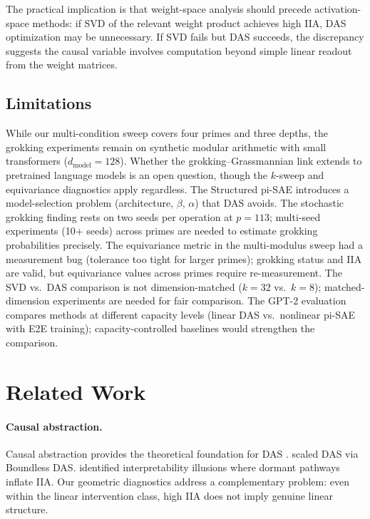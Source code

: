 \documentclass{article}
\begin{document}
The practical implication is that weight-space analysis should precede
activation-space methods: if SVD of the relevant weight product achieves
high IIA, DAS optimization may be unnecessary. If SVD fails but DAS
succeeds, the discrepancy suggests the causal variable involves
computation beyond simple linear readout from the weight matrices.

\subsection{Limitations}

While our multi-condition sweep covers four primes and three depths, the
grokking experiments remain on synthetic modular arithmetic with small
transformers ($d_\text{model} = 128$). Whether the grokking--Grassmannian
link extends to pretrained language models is an open question, though the
$k$-sweep and equivariance diagnostics apply regardless. The Structured
pi-SAE introduces a model-selection problem (architecture, $\beta$, $\alpha$)
that DAS avoids. The stochastic grokking finding rests on two seeds per
operation at $p{=}113$; multi-seed experiments (10+ seeds) across primes are
needed to estimate grokking probabilities precisely. The equivariance metric
in the multi-modulus sweep had a measurement bug (tolerance too tight for
larger primes); grokking status and IIA are valid, but equivariance values
across primes require re-measurement. The SVD vs.\ DAS comparison is not
dimension-matched ($k = 32$ vs.\ $k = 8$); matched-dimension experiments
are needed for fair comparison. The GPT-2 evaluation compares methods at
different capacity levels (linear DAS vs.\ nonlinear pi-SAE with E2E
training); capacity-controlled baselines would strengthen the comparison.


\section{Related Work}
\label{sec:related}

\paragraph{Causal abstraction.}
Causal abstraction provides the theoretical foundation for DAS
\citep{geiger2021causal, geiger2023finding}. \citet{wu2024interpretability}
scaled DAS via Boundless DAS. \citet{makelov2024illusion} identified
interpretability illusions where dormant pathways inflate IIA. Our geometric
diagnostics address a complementary problem: even within the linear intervention
class, high IIA does not imply genuine linear structure.
\end{document}
